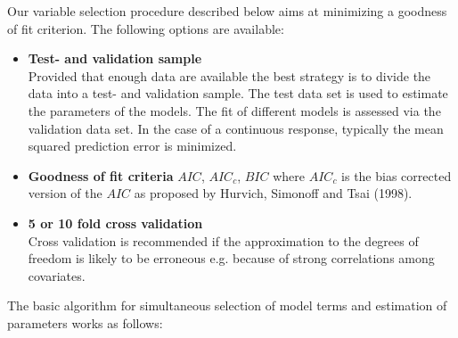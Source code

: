 \documentclass[11pt,a4paper,twoside]{bayesxarticle}
\begin{document}
Our variable selection procedure described below aims at minimizing a goodness of fit criterion. The following
options are available:
\begin{itemize}
\item {\bf Test- and validation sample} \\
Provided that enough data are available the best strategy is to divide the data into a test- and validation
sample. The test data set is used to estimate the parameters of the models. The fit of different models
is assessed via the validation data set. In the case of a continuous response, typically the mean squared prediction
error is minimized.
\item {\bf Goodness of fit criteria}  $AIC$, $AIC_{c}$, $BIC$ where $AIC_c$ is the bias corrected version of the $AIC$ as
proposed by Hurvich, Simonoff and Tsai (1998).
\item {\bf 5 or 10 fold cross validation} \\
Cross validation is recommended
if the approximation to the degrees of freedom is likely to be erroneous e.g. because of strong correlations among covariates.
\end{itemize}

The basic algorithm for simultaneous selection of model terms and
estimation of parameters works as follows:
\end{document}
